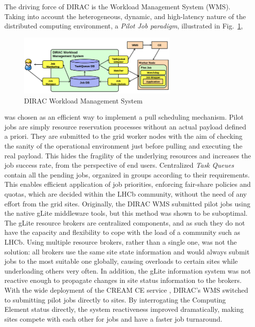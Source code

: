 \documentclass[sort&compress,preprint,3p]{elsarticle}
\begin{document}
The driving force of DIRAC is the Workload Management System (WMS). Taking into
account the heterogeneous, dynamic, and high-latency nature of the distributed computing environment, a
\textit{Pilot Job paradigm}, illustrated in Fig.~\ref{fig:DIRAC-WMS}, 
\begin{figure}[bp]
\includegraphics[width=0.7\textwidth]{./graphics/Figure2.png}
\centering
\caption{DIRAC Workload Management System \cite{DIRAC_pilot_WMS}}
\label{fig:DIRAC-WMS}
\end{figure}
was chosen as an efficient way to
implement a pull scheduling mechanism.  Pilot jobs are simply resource
reservation processes without an actual payload defined a priori. They are
submitted to the grid worker nodes with the aim of checking the sanity of the
operational environment just before pulling and executing the real payload. This
hides the fragility of the underlying resources and increases the job success
rate, from the perspective of end users. Centralized \textit{Task Queues} contain all the
pending jobs, organized in groups according to their requirements. This enables
efficient application of job priorities, enforcing fair-share policies and
quotas, which are decided within the LHCb community, without the need of any
effort from the grid sites.  Originally, the DIRAC WMS submitted pilot jobs using 
the native gLite middleware tools, but this method was shown to be suboptimal. The gLite resource brokers
are centralized components, and as such they do not have the capacity and flexibility to cope with the load of 
a community such as LHCb. Using multiple resource brokers, rather than a single one, was not the solution:
all brokers use the same site state information and would always submit jobs to the most suitable one globally, causing overloads to
certain sites while underloading others very often. In addition, the gLite information system was not reactive enough to propagate
changes in site status information to the brokers. With the wide deployment of the CREAM CE service \cite{Aiftimiei2010654}, DIRAC's WMS switched
to submitting pilot jobs directly to sites. By interrogating the Computing Element status directly, the system reactiveness
improved dramatically, making sites compete with each other for jobs and have a faster job turnaround.
 
\end{document}
